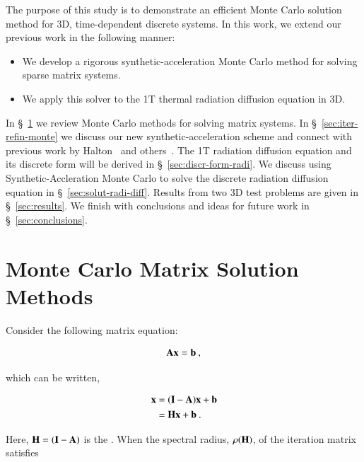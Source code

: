 \documentclass[preprint,12pt]{elsarticle}
\newcommand{\vA}{\ensuremath{\ve{A}}}
\newcommand{\vb}{\ensuremath{\ve{b}}}
\newcommand{\vx}{\ensuremath{\ve{x}}}
\newcommand{\vI}{\ensuremath{\ve{I}}}
\newcommand{\vH}{\ensuremath{\ve{H}}}
\begin{document}
The purpose of this study is to demonstrate an efficient Monte Carlo
solution method for 3D, time-dependent discrete systems. In this
work, we extend our previous work in the following manner:

\begin{itemize}
\item We develop a rigorous synthetic-acceleration Monte Carlo method
  for solving sparse matrix systems.
\item We apply this solver to the 1T thermal radiation diffusion
  equation in 3D.
\end{itemize}

In \S~\ref{sec:monte-carlo-matrix} we review Monte Carlo methods for
solving matrix systems. In \S~\ref{sec:iter-refin-monte} we discuss
our new synthetic-acceleration scheme and connect with previous work
by Halton~\cite{halton_1994} and others~\cite{evans_2003}.  The 1T
radiation diffusion equation and its discrete form will be derived in
\S~\ref{sec:discr-form-radi}.  We discuss using Synthetic-Accleration
Monte Carlo to solve the discrete radiation diffusion equation in
\S~\ref{sec:solut-radi-diff}.  Results from two 3D test problems are
given in \S~\ref{sec:results}.  We finish with conclusions and ideas
for future work in \S~\ref{sec:conclusions}.

\section{Monte Carlo Matrix Solution Methods}
\label{sec:monte-carlo-matrix}

Consider the following matrix equation:

\begin{equation}
  \vA\vx = \vb\:,
  \label{eq:Ax=b}
\end{equation}

which can be written,

\begin{equation}
  \begin{split}
    \vx &= (\vI - \vA)\vx + \vb\\
    &= \vH\vx + \vb\:.
  \end{split}
  \label{eq:point_iteration}
\end{equation}

Here, $\vH = (\vI - \vA)$ is the .  When the
spectral radius, $\rho(\vH)$, of the iteration matrix satisfies
\end{document}
